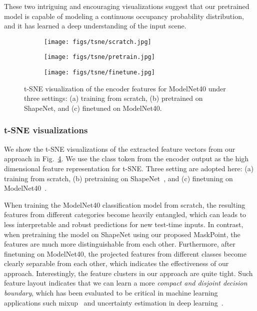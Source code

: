 \documentclass[runningheads]{llncs}
\begin{document}
These two intriguing and encouraging visualizations suggest that our pretrained model is capable of modeling a continuous occupancy probability distribution, and it has learned a deep understanding of the input scene.


\begin{figure}[htbp]
   \vspace{-10pt}
    \begin{subfigure}[t]{0.32\textwidth}
      \centering
      \texttt{[image: figs/tsne/scratch.jpg]}
      \label{fig:sub-second}
    \end{subfigure}
     \begin{subfigure}[t]{0.32\textwidth}
      \centering
\texttt{[image: figs/tsne/pretrain.jpg]}  
      \label{fig:sub-second2}
    \end{subfigure}
    \begin{subfigure}[t]{0.32\textwidth}
      \centering
\texttt{[image: figs/tsne/finetune.jpg]}  
      \label{fig:sub-second3}
    \end{subfigure}
    \caption{t-SNE visualization of the encoder features for ModelNet40 under three settings: (a) training from scratch, (b) pretrained on ShapeNet, and (c) finetuned on ModelNet40.}
    \vspace{-3ex}
    \label{fig:t_sne}
    \end{figure}
    
\vspace{-15pt}
\subsubsection{t-SNE visualizations}

We show the t-SNE visualizations of the extracted feature vectors from our approach in Fig.~\ref{fig:t_sne}. We use the class token from the encoder output as the high dimensional feature representation for t-SNE. Three setting are adopted here: (a) training from scratch, (b) pretraining on ShapeNet~\cite{chang2015shapenet}, and (c) finetuning on ModelNet40~\cite{wu20153d}.

When training the ModelNet40 classification model from scratch, the resulting features from different categories become heavily entangled, which can leads to less interpretable and robust predictions for new test-time inputs. In contrast, when pretraining the model on ShapeNet using our proposed MaskPoint, the features are much more distinguishable from each other. Furthermore, after finetuning on ModelNet40, the projected features from different classes become clearly separable from each other, which indicates the effectiveness of our approach. Interestingly, the feature clusters in our approach are quite tight. Such feature layout indicates that we can learn a more \textit{compact and disjoint decision boundary}, which has been evaluated to be critical in machine learning applications such mixup~\cite{cutmix,thulasidasan2019mixup} and uncertainty estimation in deep learning~\cite{du2022vos}.
\end{document}
